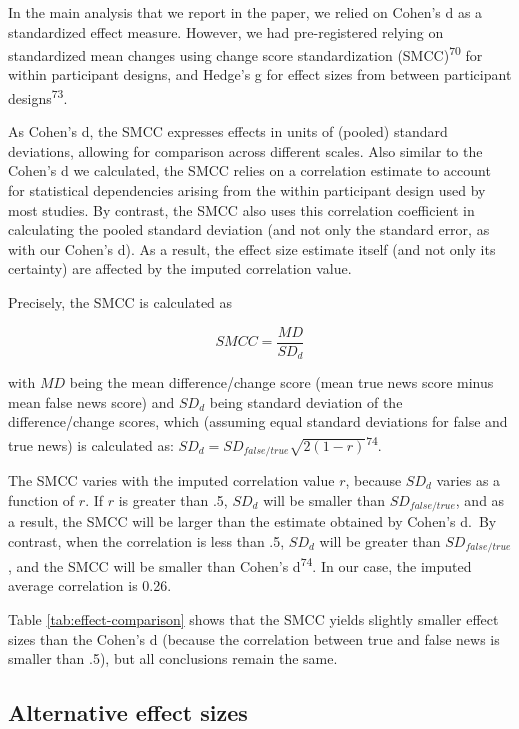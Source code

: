 \documentclass[
  man]{apa6}
\begin{document}
\FloatBarrier

In the main analysis that we report in the paper, we relied on Cohen's d as a standardized effect measure. However, we had pre-registered relying on standardized mean changes using change score standardization (SMCC)\textsuperscript{70} for within participant designs, and Hedge's g for effect sizes from between participant designs\textsuperscript{73}.

As Cohen's d, the SMCC expresses effects in units of (pooled) standard deviations, allowing for comparison across different scales. Also similar to the Cohen's d we calculated, the SMCC relies on a correlation estimate to account for statistical dependencies arising from the within participant design used by most studies. By contrast, the SMCC also uses this correlation coefficient in calculating the pooled standard deviation (and not only the standard error, as with our Cohen's d). As a result, the effect size estimate itself (and not only its certainty) are affected by the imputed correlation value.

Precisely, the SMCC is calculated as

\[
SMCC = \frac{MD}{SD_d}
\]

with \(MD\) being the mean difference/change score (mean true news score minus mean false news score) and \(SD_d\) being standard deviation of the difference/change scores, which (assuming equal standard deviations for false and true news) is calculated as: \(SD_d = SD_{false/true}\sqrt{2(1-r)}\)\textsuperscript{74}.

The SMCC varies with the imputed correlation value \(r\), because \(SD_d\) varies as a function of \(r\). If \(r\) is greater than .5, \(SD_d\) will be smaller than \(SD_{false/true}\), and as a result, the SMCC will be larger than the estimate obtained by Cohen's d.~By contrast, when the correlation is less than .5, \(SD_d\) will be greater than \(SD_{false/true}\), and the SMCC will be smaller than Cohen's d\textsuperscript{74}. In our case, the imputed average correlation is 0.26.

Table \ref{tab:effect-comparison} shows that the SMCC yields slightly smaller effect sizes than the Cohen's d (because the correlation between true and false news is smaller than .5), but all conclusions remain the same.

\subsection{Alternative effect sizes}\label{alternative-effect-sizes}
\end{document}
